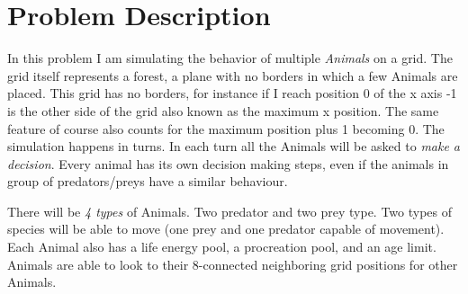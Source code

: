 \documentclass[11pt]{article}
\begin{document}
\iffalse
	
\fi

\section*{Problem Description}

In this problem I am simulating the behavior of multiple \emph{Animals} on a grid. The grid itself represents a forest, a plane with no borders in which a few Animals are placed. This grid has no borders, for instance if I reach position 0 of the x axis -1 is the other side of the grid also known as the maximum x position. The same feature of course also counts for the maximum position plus 1 becoming 0. The simulation happens in turns. In each turn all the Animals will be asked to \emph{make a decision}. Every animal has its own decision making steps, even if the animals in group of predators/preys have a similar behaviour.

There will be \emph{4 types} of Animals. Two predator and two prey type. Two types of species will be able to move (one prey and one predator capable of movement). Each Animal also has a life energy pool, a procreation pool, and an age limit. Animals are able to look to their 8-connected neighboring grid positions for other Animals.
\end{document}

